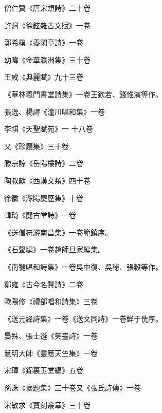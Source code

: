 \begin{pinyinscope}
 僧仁贊《唐宋類詩》二十卷



 許洞《徐鉉雜古文賦》一卷



 郭希樸《養閑亭詩》一卷



 幼暐《金華瀛洲集》三十卷



 王咸《典麗賦》九十三卷



 《華林義門書堂詩集》一卷王欽若、錢惟演等作。



 張逸、楊諤《潼川唱和集》一卷



 李祺《天聖賦苑》一
 十八卷



 又《珍題集》三十卷



 滕宗諒《岳陽樓詩》二卷



 陶叔獻《西漢文類》四十卷



 徐徽《滁陽慶歷集》十卷



 韓琦《閱古堂詩》一卷



 《送僧符游南昌集》一卷範鎮序。



 《石聲編》一卷趙師旦家編集。



 《南犍唱和詩集》一卷吳中復、吳秘、張穀等作。



 鄭雍《古今名賢詩》二卷



 歐陽修《禮部唱和詩集》三卷



 《送元絳詩集》一卷《送文同詩》一卷鮮于侁序。



 晏殊、張士遜《笑臺詩》一卷



 慧明大師《靈應天竺集》一卷



 宋璋《錦裏玉堂編》五卷



 孫洙《褒題集》三十卷又《張氏詩傳》一卷



 宋敏求《寶刻叢章》三十卷




\end{pinyinscope}
